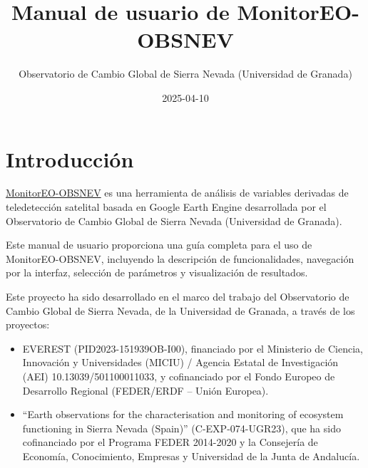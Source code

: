 \documentclass[
]{book}
\title{Manual de usuario de MonitorEO-OBSNEV}
\author{Observatorio de Cambio Global de Sierra Nevada (Universidad de Granada)}
\date{2025-04-10}
\begin{document}
\maketitle

{
\setcounter{tocdepth}{1}
\tableofcontents
}
\chapter{Introducción}\label{intro}

\href{https://sl.ugr.es/monitoreoobsnev}{MonitorEO-OBSNEV} es una herramienta de análisis de variables derivadas de teledetección satelital basada en Google Earth Engine desarrollada por el Observatorio de Cambio Global de Sierra Nevada (Universidad de Granada).

Este manual de usuario proporciona una guía completa para el uso de MonitorEO-OBSNEV, incluyendo la descripción de funcionalidades, navegación por la interfaz, selección de parámetros y visualización de resultados.

Este proyecto ha sido desarrollado en el marco del trabajo del Observatorio de Cambio Global de Sierra Nevada, de la Universidad de Granada, a través de los proyectos:

\begin{itemize}
\item
  EVEREST (PID2023-151939OB-I00), financiado por el Ministerio de Ciencia, Innovación y Universidades (MICIU) / Agencia Estatal de Investigación (AEI) 10.13039/501100011033, y cofinanciado por el Fondo Europeo de Desarrollo Regional (FEDER/ERDF -- Unión Europea).
\item
  ``Earth observations for the characterisation and monitoring of ecosystem functioning in Sierra Nevada (Spain)'' (C-EXP-074-UGR23), que ha sido cofinanciado por el Programa FEDER 2014-2020 y la Consejería de Economía, Conocimiento, Empresas y Universidad de la Junta de Andalucía.
\end{itemize}
\end{document}
